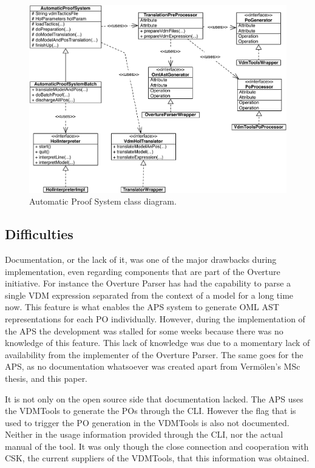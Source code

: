 \documentclass[]{article}
\begin{document}
\begin{figure}[p]
    \includegraphics[width=1.2\textwidth]{images/aps_class_diagram.pdf}
    \caption[APS class diagram]{Automatic Proof System class diagram.}
    \label{fig:aps_class}
\end{figure}



\subsection{Difficulties}
\label{sub:implementation_difficulties}

Documentation, or the lack of it, was one of the major drawbacks during implementation, even regarding components that are part of the Overture initiative.
For instance the Overture Parser has had the capability to parse a single VDM expression separated from the context of a model for a long time now.
This feature is what enables the APS system to generate OML AST representations for each PO individually.
However, during the implementation of the APS the development was stalled for some weeks because there was no knowledge of this feature.
This lack of knowledge was due to a momentary lack of availability from the implementer of the Overture Parser.
The same goes for the APS, as no documentation whatsoever was created apart from Verm\"olen's MSc thesis, and this paper.

It is not only on the open source side that documentation lacked. 
The APS uses the VDMTools to generate the POs through the CLI.
However the flag that is used to trigger the PO generation in the VDMTools is also not documented.
Neither in the usage information provided through the CLI, nor the actual manual of the tool.
It was only though the close connection and cooperation with CSK, the current suppliers of the VDMTools, that this information was obtained.
\end{document}
